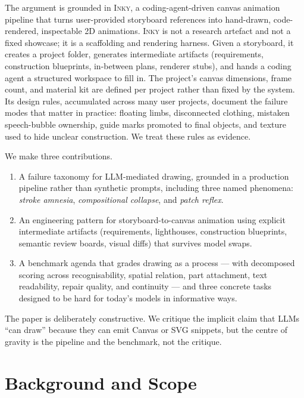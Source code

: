\documentclass[10pt,twocolumn]{article}
\newcommand{\term}[1]{\textit{#1}}
\newcommand{\inky}{\textsc{Inky}}
\begin{document}
The argument is grounded in \inky{}, a coding-agent-driven canvas
animation pipeline that turns user-provided storyboard references
into hand-drawn, code-rendered, inspectable 2D animations. \inky{}
is not a research artefact and not a fixed showcase; it is a
scaffolding and rendering harness. Given a storyboard, it creates
a project folder, generates intermediate artifacts (requirements,
construction blueprints, in-between plans, renderer stubs), and
hands a coding agent a structured workspace to fill in. The
project's canvas dimensions, frame count, and material kit are
defined per project rather than fixed by the system. Its design
rules, accumulated across many user projects, document the
failure modes that matter in practice: floating limbs,
disconnected clothing, mistaken speech-bubble ownership, guide
marks promoted to final objects, and texture used to hide unclear
construction. We treat these rules as evidence.

We make three contributions.

\begin{enumerate}[leftmargin=*,nosep,itemsep=0.25em]
  \item A failure taxonomy for LLM-mediated drawing, grounded in a
    production pipeline rather than synthetic prompts, including
    three named phenomena: \term{stroke amnesia}, \term{compositional
    collapse}, and \term{patch reflex}.
  \item An engineering pattern for storyboard-to-canvas animation
    using explicit intermediate artifacts (requirements,
    lighthouses, construction blueprints, semantic review boards,
    visual diffs) that survives model swaps.
  \item A benchmark agenda that grades drawing as a process --- with
    decomposed scoring across recognisability, spatial relation,
    part attachment, text readability, repair quality, and
    continuity --- and three concrete tasks designed to be hard for
    today's models in informative ways.
\end{enumerate}

The paper is deliberately constructive. We critique the implicit
claim that LLMs ``can draw'' because they can emit Canvas or SVG
snippets, but the centre of gravity is the pipeline and the
benchmark, not the critique.

\section{Background and Scope}
\end{document}
